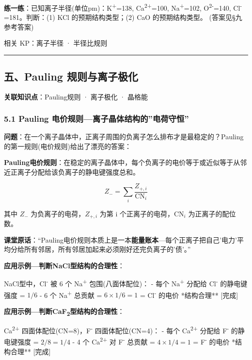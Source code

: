 \textbf{练一练}：已知离子半径(单位pm)：K\textsuperscript{+}=138, Ca\textsuperscript{2+}=100, Na\textsuperscript{+}=102, O\textsuperscript{2-}=140, Cl\textsuperscript{-}=181。判断：(1) KCl 的预期结构类型；(2) CaO 的预期结构类型。
(答案见§九参考答案)

相关 KP：离子半径 · 半径比规则

\begin{center}\rule{0.5\linewidth}{0.5pt}\end{center}

\subsection{五、Pauling 规则与离子极化}\label{ux4e94pauling-ux89c4ux5219ux4e0eux79bbux5b50ux6781ux5316}

\textbf{关联知识点}：Pauling规则 · 离子极化 · 晶格能

\subsubsection{5.1 Pauling 电价规则---离子晶体结构的''电荷守恒''}\label{pauling-ux7535ux4ef7ux89c4ux5219ux79bbux5b50ux6676ux4f53ux7ed3ux6784ux7684ux7535ux8377ux5b88ux6052}

\textbf{问题}：在一个离子晶体中，正离子周围的负离子怎么排布才是最稳定的？Pauling 的第一规则(电价规则)给出了漂亮的答案：

\textbf{Pauling电价规则}：在稳定的离子晶体中，每个负离子的电价等于或近似等于从邻近正离子分配给该负离子的静电键强度总和。

\[
Z_- = \sum_i \frac{Z_{+,i}}{\text{CN}_i}
\]

其中 \(Z_-\) 为负离子的电荷，\(Z_{+,i}\) 为第 i 个正离子的电荷，\(\text{CN}_i\) 为正离子的配位数。

\textbf{课堂原话}：``Pauling电价规则本质上是一本\textbf{能量账本}---每个正离子把自己'电力'平均分给所有邻居，所有邻居加起来必须刚好还完负离子的'债'。''

\textbf{应用示例---判断NaCl型结构的合理性}：

NaCl型中，Cl\textsuperscript{-} 被 6 个 Na\textsuperscript{+} 包围(八面体配位)：
- 每个 Na\textsuperscript{+} 分配给 Cl\textsuperscript{-} 的静电键强度 = \(1/6\)
- 6 个 Na\textsuperscript{+} 总贡献 = \(6 \times 1/6 = 1\) = Cl\textsuperscript{-} 的电价 \箭 **结构合理** {[}完成{]}

\textbf{应用示例---判断CaF\textsubscript{2}型结构的合理性}：

Ca\textsuperscript{2+} 四面体配位(CN=8)，F\textsuperscript{-} 四面体配位(CN=4)：
- 每个 Ca\textsuperscript{2+} 分配给 F\textsuperscript{-} 的静电键强度 = \(2/8 = 1/4\)
- 4 个 Ca\textsuperscript{2+} 对 F\textsuperscript{-} 总贡献 = \(4 \times 1/4 = 1\) = F\textsuperscript{-} 的电价 \箭 **结构合理** {[}完成{]}


